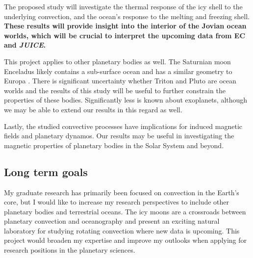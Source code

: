 \documentclass[12pt]{article}
\begin{document}
The proposed study will investigate the thermal response of the icy shell to the underlying convection, and the ocean's response to the melting and freezing shell. 
\textbf{These results will provide insight into the interior of the Jovian ocean worlds, which will be crucial to interpret the upcoming data from EC and \textit{JUICE}.}

This project applies to other planetary bodies as well. The Saturnian moon Enceladus likely contains a sub-surface ocean and has a similar geometry to Europa \citep{kS24}. There is significant uncertainty whether Triton\citep{jK22} and Pluto\citep{kS24} are ocean worlds and the results of this study will be useful to further constrain the properties of these bodies. 
Significantly less is known about exoplanets, although we may be able to extend our results in this regard as well.

Lastly, the studied convective processes have implications for induced magnetic fields and planetary dynamos. Our results may be useful in investigating the magnetic properties of planetary bodies in the Solar System and beyond.
%
\subsection{Long term goals}
My graduate research has primarily been focused on convection in the Earth's core, but I would like to increase my research perspectives to include other planetary bodies and terrestrial oceans. The icy moons are a crossroads between planetary convection and oceanography and present an exciting natural laboratory for studying rotating convection where new data is upcoming. This project would broaden my expertise and improve my outlooks when applying for research positions in the planetary sciences.

\begin{spacing}{0.4}

\printbibliography

\end{spacing}
\end{document}
